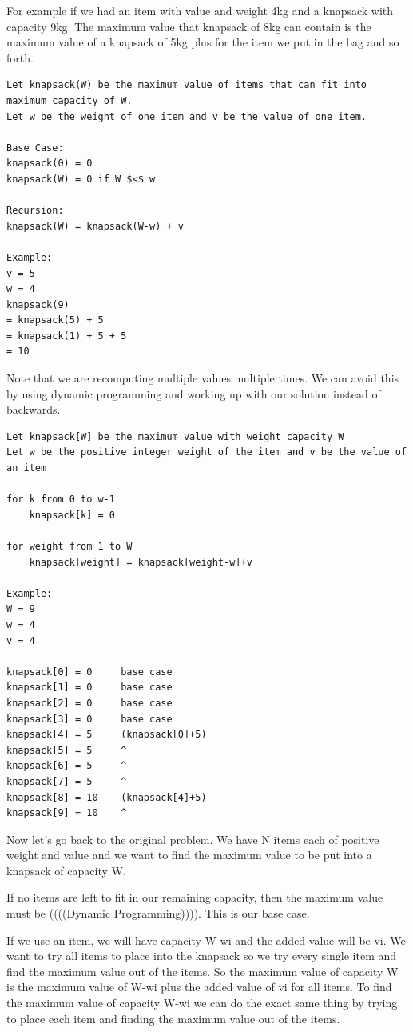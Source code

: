 \documentclass[11pt,oneside]{book}
\begin{document}
For example if we had an item with value  and weight 4kg and a knapsack with capacity 9kg. The maximum value that knapsack of 8kg can contain is the maximum value of a knapsack of 5kg plus  for the item we put in the bag and so forth.

\begin{lstlisting}
Let knapsack(W) be the maximum value of items that can fit into maximum capacity of W.
Let w be the weight of one item and v be the value of one item.

Base Case:
knapsack(0) = 0
knapsack(W) = 0 if W $<$ w

Recursion:
knapsack(W) = knapsack(W-w) + v

Example:
v = 5
w = 4
knapsack(9)
= knapsack(5) + 5
= knapsack(1) + 5 + 5
= 10
\end{lstlisting}

Note that we are recomputing multiple values multiple times. We can avoid this by using dynamic programming and working up with our solution instead of backwards.

\begin{lstlisting}
Let knapsack[W] be the maximum value with weight capacity W
Let w be the positive integer weight of the item and v be the value of an item

for k from 0 to w-1
    knapsack[k] = 0

for weight from 1 to W
    knapsack[weight] = knapsack[weight-w]+v

Example:
W = 9
w = 4
v = 4

knapsack[0] = 0     base case
knapsack[1] = 0     base case
knapsack[2] = 0     base case
knapsack[3] = 0     base case
knapsack[4] = 5     (knapsack[0]+5)
knapsack[5] = 5     ^
knapsack[6] = 5     ^
knapsack[7] = 5     ^
knapsack[8] = 10    (knapsack[4]+5)
knapsack[9] = 10    ^
\end{lstlisting}

Now let's go back to the original problem. We have N items each of positive weight and value and we want to find the maximum value to be put into a knapsack of capacity W.

If no items are left to fit in our remaining capacity, then the maximum value must be ((((Dynamic Programming)))). This is our base case.

If we use an item, we will have capacity W-wi and the added value will be vi. We want to try all items to place into the knapsack so we try every single item and find the maximum value out of the items. So the maximum value of capacity W is the maximum value of W-wi plus the added value of vi for all items. To find the maximum value of capacity W-wi we can do the exact same thing by trying to place each item and finding the maximum value out of the items.
\end{document}

